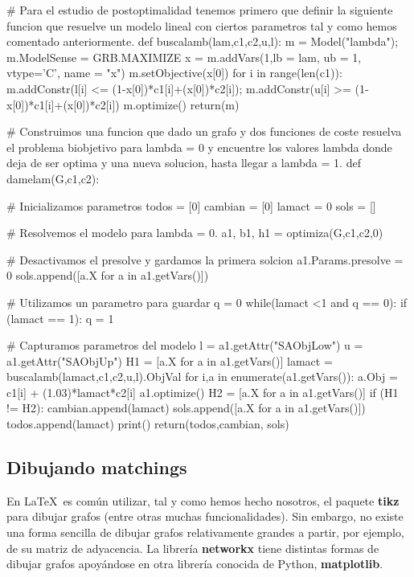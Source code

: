 \documentclass[twoside,a4paper,openright,12pt,tikz]{book}
\begin{document}
\begin{pythone}
# Para el estudio de postoptimalidad tenemos primero que definir la siguiente funcion que resuelve un modelo lineal con ciertos parametros tal y como hemos comentado anteriormente.
def buscalamb(lam,c1,c2,u,l):  
    m = Model("lambda");
    m.ModelSense = GRB.MAXIMIZE
    x = m.addVars(1,lb = lam, ub = 1, vtype='C', name = "x")
    m.setObjective(x[0])
    for i in range(len(c1)):
        m.addConstr(l[i] <= (1-x[0])*c1[i]+(x[0])*c2[i]);
        m.addConstr(u[i] >= (1-x[0])*c1[i]+(x[0])*c2[i])
    m.optimize()    
    return(m)
    

# Construimos una funcion que dado un grafo y dos funciones de coste resuelva el problema biobjetivo para lambda = 0 y encuentre los valores lambda donde deja de ser optima y una nueva solucion, hasta llegar a lambda = 1.
def damelam(G,c1,c2):
    
    # Inicializamos parametros
    todos = [0]
    cambian = [0]
    lamact = 0
    sols = []
    
    # Resolvemos el modelo para lambda = 0.
    a1, b1, h1 = optimiza(G,c1,c2,0)
    
    # Desactivamos el presolve y gardamos la primera solcion
    a1.Params.presolve = 0
    sols.append([a.X for a in a1.getVars()])
    
    # Utilizamos un parametro para guardar 
    q = 0
    while(lamact <1 and q == 0):
        if (lamact == 1):
            q = 1
            
        # Capturamos parametros del modelo
        l = a1.getAttr("SAObjLow")
        u = a1.getAttr("SAObjUp")
        H1 = [a.X for a in a1.getVars()]
        lamact = buscalamb(lamact,c1,c2,u,l).ObjVal
        for i,a in enumerate(a1.getVars()):
            a.Obj = c1[i] + (1.03)*lamact*c2[i]
        a1.optimize()
        H2 = [a.X for a in a1.getVars()]
        if (H1 != H2):
            cambian.append(lamact)
        sols.append([a.X for a in a1.getVars()])
        todos.append(lamact)
    print()
    return(todos,cambian, sols)
\end{pythone}
\newpage
\subsection{Dibujando matchings}
En \LaTeX\, es común utilizar, tal y como hemos hecho nosotros, el paquete \textbf{tikz} para dibujar grafos (entre otras muchas funcionalidades). Sin embargo, no existe una forma sencilla de dibujar grafos relativamente grandes a partir, por ejemplo, de su matriz de adyacencia. La librería \textbf{networkx} tiene distintas formas de dibujar grafos apoyándose en otra librería conocida de Python, \textbf{matplotlib}. 
\end{document}
